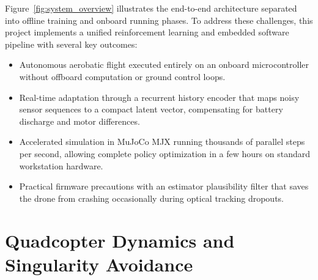 \documentclass[11pt,a4paper]{article}
\begin{document}
Figure~\ref{fig:system_overview} illustrates the end-to-end architecture separated into offline training and onboard running phases. To address these challenges, this project implements a unified reinforcement learning and embedded software pipeline with several key outcomes:
\begin{itemize}[leftmargin=*,itemsep=2pt]
  \item Autonomous aerobatic flight executed entirely on an onboard microcontroller without offboard computation or ground control loops.
  \item Real-time adaptation through a recurrent history encoder that maps noisy sensor sequences to a compact latent vector, compensating for battery discharge and motor differences.
  \item Accelerated simulation in MuJoCo MJX running thousands of parallel steps per second, allowing complete policy optimization in a few hours on standard workstation hardware.
  \item Practical firmware precautions with an estimator plausibility filter that saves the drone from crashing occasionally during optical tracking dropouts.
\end{itemize}

\section{Quadcopter Dynamics and Singularity Avoidance}
\label{sec:dynamics}
\end{document}
